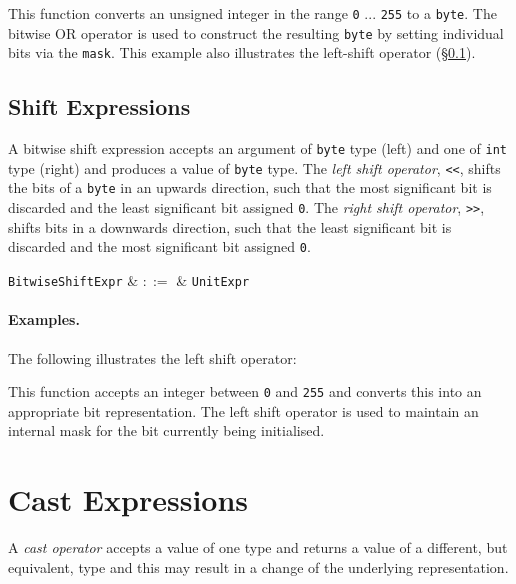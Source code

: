 This function converts an unsigned integer in the range \lstinline{0} ... \lstinline{255} to a \lstinline{byte}.  The bitwise OR operator is used to construct the resulting \lstinline{byte} by setting individual bits via the \lstinline{mask}.  This example also illustrates the left-shift operator (\S\ref{c_expr_shift}).


\subsection{Shift Expressions}
\label{c_expr_shift}

A bitwise shift expression accepts an argument of \lstinline{byte} type (left) and one of \lstinline{int} type (right) and produces a value of \lstinline{byte} type.  The {\em left shift operator}, \lstinline{<<}, shifts the bits of a \lstinline{byte} in an upwards direction, such that the most significant bit is discarded and the least significant bit assigned \lstinline{0}.  The {\em right shift operator}, \lstinline{>>}, shifts bits in a downwards direction, such that the least significant bit is discarded and the most significant bit assigned \lstinline{0}.  

\begin{syntax}
  \verb+BitwiseShiftExpr+ & $::=$ & \verb+UnitExpr+\ 
\end{syntax}

\paragraph{Examples.} The following illustrates the left shift operator:



This function accepts an integer between \lstinline{0} and \lstinline{255} and converts this into an appropriate bit representation.  The left shift operator is used to maintain an internal mask for the bit currently being initialised.


\section{Cast Expressions}
\label{c_expr_cast}
A {\em cast operator} accepts a value of one type and returns a value of a different, but equivalent, type and this may result in a change of the underlying representation.  

